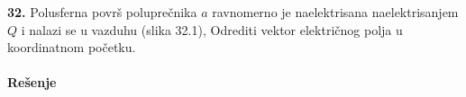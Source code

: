 \textbf{\Large 32.} Polusferna povr\v{s} polupre\v{c}nika $a$ ravnomerno je naelektrisana naelektrisanjem $Q$ i nalazi se u vazduhu (slika 32.1), Odrediti vektor elektri\v{c}nog polja u koordinatnom po\v{c}etku.
\\\\
\textbf{\Large Re\v{s}enje}\\
